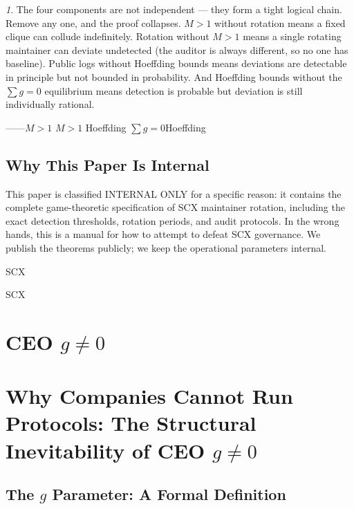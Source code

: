 \documentclass[12pt,a4paper]{article}
\theoremstyle{remark}
\newtheorem{govnote}{}[section]
\newenvironment{govbox}{%
  \begin{center}
  \color{blue}
  \begin{minipage}{0.92\textwidth}
  \begin{govnote}
}{%
  \end{govnote}
  \end{minipage}
  \end{center}
}
\begin{document}
\begin{govbox}
The four components are not independent — they form a tight logical chain. Remove
any one, and the proof collapses. $M > 1$ without rotation means a fixed clique
can collude indefinitely. Rotation without $M > 1$ means a single rotating
maintainer can deviate undetected (the auditor is always different, so no one
has baseline). Public logs without Hoeffding bounds means deviations are
detectable in principle but not bounded in probability. And Hoeffding bounds
without the $\sum g = 0$ equilibrium means detection is probable but deviation
is still individually rational.

\begin{center}
\small\textbf{}
——$M>1$
$M>1$
Hoeffding
$\sum g=0$Hoeffding
\end{center}
\end{govbox}

\subsection{Why This Paper Is Internal}

This paper is classified INTERNAL ONLY for a specific reason: it contains the
complete game-theoretic specification of SCX maintainer rotation, including the
exact detection thresholds, rotation periods, and audit protocols. In the wrong
hands, this is a manual for how to attempt to defeat SCX governance. We publish
the theorems publicly; we keep the operational parameters internal.

\noindent\textbf{} SCX

SCX

\newpage

\section{CEO $g \neq 0$}
\section{Why Companies Cannot Run Protocols: The Structural Inevitability of CEO $g \neq 0$}

\subsection{The $g$ Parameter: A Formal Definition}
\end{document}
